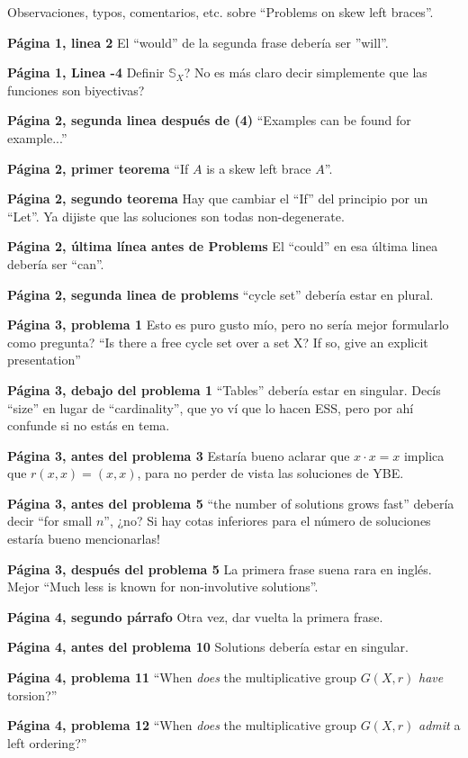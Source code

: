\documentclass[11pt,fleqn]{article}
\begin{document}
Observaciones, typos, comentarios, etc. sobre ``Problems on skew left braces''.

\textbf{Página 1, linea 2} El ``would'' de la segunda frase debería ser 
''will''.

\textbf{Página 1, Linea -4} Definir $\mathbb S_X$? No es más claro decir 
simplemente que las funciones son biyectivas?

\textbf{Página 2, segunda linea después de (4)} ``Examples can be found for 
example...''

\textbf{Página 2, primer teorema} ``If $A$ is a skew left brace $A$''.

\textbf{Página 2, segundo teorema} Hay que cambiar el ``If'' del principio por 
un ``Let''. Ya dijiste que las soluciones son todas non-degenerate.

\textbf{Página 2, última línea antes de Problems} El ``could'' en esa última 
linea debería ser ``can''. 

\textbf{Página 2, segunda linea de problems} ``cycle set'' debería estar en 
plural.

\textbf{Página 3, problema 1} Esto es puro gusto mío, pero no sería mejor 
formularlo como pregunta? ``Is there a free cycle set over a set X? If so, give 
an explicit presentation''

\textbf{Página 3, debajo del problema 1} ``Tables'' debería estar en singular. 
Decís ``size'' en lugar de ``cardinality'', que yo ví que lo hacen ESS, pero por 
ahí confunde si no estás en tema.

\textbf{Página 3, antes del problema 3} Estaría bueno aclarar que $x \cdot x = 
x$ implica que $r(x,x) = (x,x)$, para no perder de vista las soluciones de YBE.

\textbf{Página 3, antes del problema 5} ``the number of solutions grows fast'' 
debería decir ``for small $n$'', ¿no? Si hay cotas inferiores para el número de 
soluciones estaría bueno mencionarlas!

\textbf{Página 3, después del problema 5} La primera frase suena rara en 
inglés. Mejor ``Much less is known for non-involutive solutions''.

\textbf{Página 4, segundo párrafo} Otra vez, dar vuelta la primera frase.

\textbf{Página 4, antes del problema 10} Solutions debería estar en singular.

\textbf{Página 4, problema 11} ``When \emph{does} the multiplicative group 
$G(X,r)$ \emph{have} torsion?'' 

\textbf{Página 4, problema 12} ``When \emph{does} the multiplicative group 
$G(X,r)$ \emph{admit} a left ordering?'' 
\end{document}
